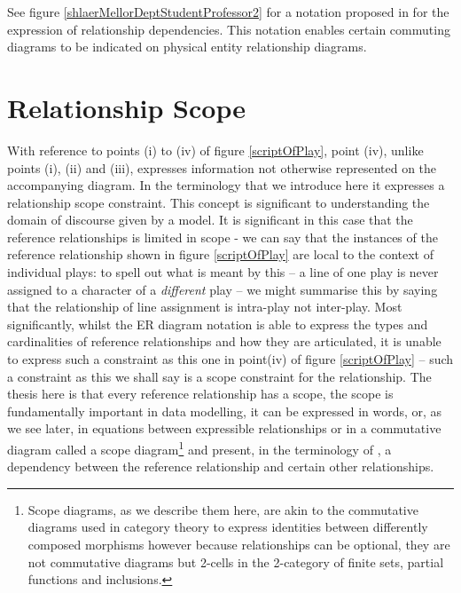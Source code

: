 \documentclass[10pt,a4paper]{article}
\begin{document}
\noindent  See figure \ref{shlaerMellorDeptStudentProfessor2} for a notation proposed in\cite{Shlaer96}  for
the expression of relationship dependencies. This notation enables certain commuting diagrams to be indicated on physical entity relationship diagrams.


\section {Relationship Scope}

\noindent With reference to points (i) to (iv) of figure \ref{scriptOfPlay}, point (iv), unlike points (i), (ii) and (iii), expresses information not otherwise represented on the accompanying diagram. 
In the terminology that we introduce here it expresses a relationship scope constraint. This concept is significant to understanding the domain of discourse given by a model.
It is significant in this case that the reference relationships is limited in scope - we can say that the
instances of the reference relationship shown in figure \ref{scriptOfPlay} are local to the context of individual plays: to spell out what is meant by this -- a line of one play is never assigned to a character of a \textit{different} play -- we might summarise this by saying that the relationship of line assignment is intra-play not inter-play. Most significantly, whilst the ER diagram notation is able to express the types and cardinalities of reference relationships and how they are articulated, it is unable to express such a constraint as this one in point(iv) of figure \ref{scriptOfPlay} -- 
such a constraint as this we shall say is a scope constraint for the relationship.  
The thesis here is that every reference relationship has a scope, the scope is fundamentally important in data modelling,  it can be expressed in words, or, as we see later, in equations between expressible relationships or in a commutative diagram called a scope diagram\footnote{Scope diagrams, as we describe them here, are akin to the commutative diagrams used in category theory to express identities between differently composed morphisms however because relationships can be optional, they are not commutative diagrams but 2-cells in the 2-category of finite sets, partial functions and inclusions.} and present, in the terminology of 
\cite{Shlaer96}, a dependency between the reference relationship and certain other relationships. \\
\end{document}
